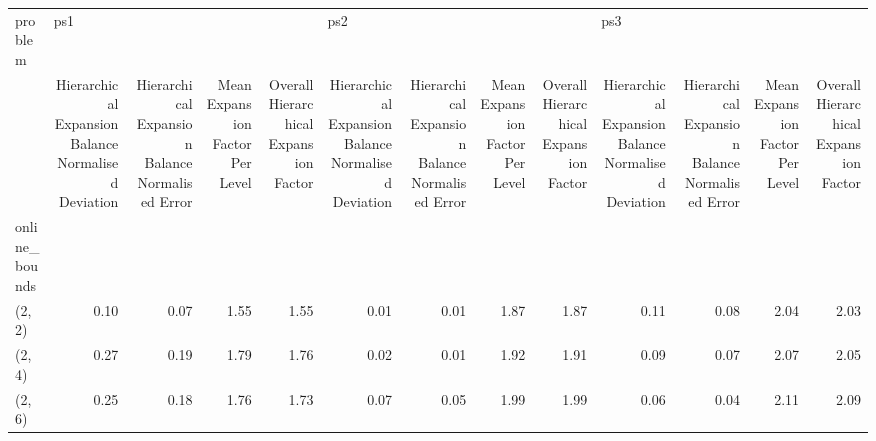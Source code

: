 \begin{tabular}{lrrrrrrrrrrrr}
\toprule
problem & \multicolumn{4}{l}{ps1} & \multicolumn{4}{l}{ps2} & \multicolumn{4}{l}{ps3} \\
{} & Hierarchical Expansion Balance Normalised Deviation & Hierarchical Expansion Balance Normalised Error & Mean Expansion Factor Per Level & Overall Hierarchical Expansion Factor & Hierarchical Expansion Balance Normalised Deviation & Hierarchical Expansion Balance Normalised Error & Mean Expansion Factor Per Level & Overall Hierarchical Expansion Factor & Hierarchical Expansion Balance Normalised Deviation & Hierarchical Expansion Balance Normalised Error & Mean Expansion Factor Per Level & Overall Hierarchical Expansion Factor \\
online\_bounds &                                                     &                                                 &                                 &                                       &                                                     &                                                 &                                 &                                       &                                                     &                                                 &                                 &                                       \\
\midrule
(2, 2)        &                                               0.10 &                                            0.07 &                            1.55 &                                  1.55 &                                               0.01 &                                            0.01 &                            1.87 &                                  1.87 &                                               0.11 &                                            0.08 &                            2.04 &                                  2.03 \\
(2, 4)        &                                               0.27 &                                            0.19 &                            1.79 &                                  1.76 &                                               0.02 &                                            0.01 &                            1.92 &                                  1.91 &                                               0.09 &                                            0.07 &                            2.07 &                                  2.05 \\
(2, 6)        &                                               0.25 &                                            0.18 &                            1.76 &                                  1.73 &                                               0.07 &                                            0.05 &                            1.99 &                                  1.99 &                                               0.06 &                                            0.04 &                            2.11 &                                  2.09 \\

\end{tabular}
